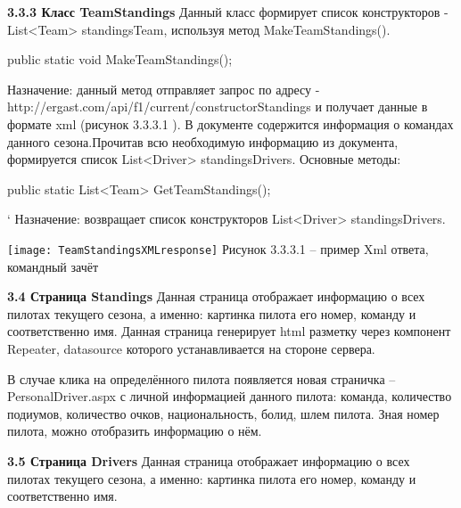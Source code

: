 \documentclass[14pt,a4paper]{extreport}
\begin{document}
	\flushleft\hspace{4ex}\textbf{3.3.3 Класс TeamStandings}
\flushleft\hspace{4ex}Данный класс формирует список конструкторов - List<Team> standingsTeam, используя метод MakeTeamStandings().\par
\flushleft\hspace{4ex}public static void MakeTeamStandings();\par
\hspace{4ex}Назначение: данный метод отправляет запрос по адресу - http://ergast.com/api/f1/current/constructorStandings и получает данные в формате xml (рисунок 3.3.3.1 ). В документе содержится информация о командах данного сезона.Прочитав всю необходимую информацию из документа, формируется список List<Driver> standingsDrivers. Основные методы:\par
\flushleft\hspace{4ex}public static List<Team> GetTeamStandings();\par`
\hspace{4ex}Назначение: возвращает список конструкторов List<Driver> standingsDrivers.\par	
	\texttt{[image: TeamStandingsXMLresponse]}   
           \center Рисунок 3.3.3.1 – пример Xml ответа, командный зачёт \par
	\flushleft\hspace{4ex}\textbf{3.4 Страница Standings}
\flushleft\hspace{4ex}Данная страница отображает информацию о всех пилотах текущего сезона, а именно: картинка пилота его номер, команду и соответственно имя.
Данная страница генерирует html разметку через компонент Repeater, datasource которого устанавливается на стороне сервера.\par
В случае клика на определённого пилота появляется новая страничка – PersonalDriver.aspx с личной информацией данного пилота: команда, количество подиумов, количество очков, национальность, болид, шлем пилота. Зная номер пилота, можно отобразить информацию о нём.\par
	\flushleft\hspace{4ex}\textbf{3.5 Страница Drivers}
\flushleft\hspace{4ex}Данная страница отображает информацию о всех пилотах текущего сезона, а именно: картинка пилота его номер, команду и соответственно имя.
\end{document}
